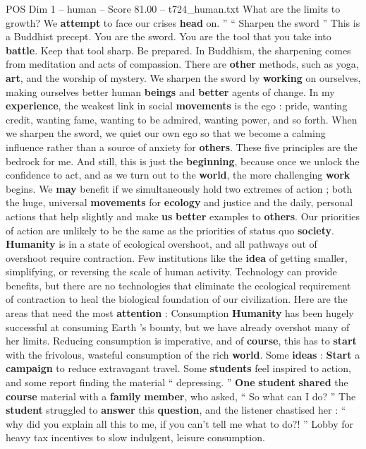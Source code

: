 \begin{textsample}{POS Dim 1 – human – Score 81.00 – t724\_human.txt}
What are the limits to growth?
We \textbf{attempt} to face our crises \textbf{head} on. ” “ Sharpen the sword ” This is a Buddhist precept.
You are the sword.
You are the tool that you take into \textbf{battle}.
Keep that tool sharp.
Be prepared.
In Buddhism, the sharpening comes from meditation and acts of compassion.
There are \textbf{other} methods, such as yoga, \textbf{art}, and the worship of mystery.
We sharpen the sword by \textbf{working} on ourselves, making ourselves better human \textbf{beings} and \textbf{better} agents of change.
In my \textbf{experience}, the weakest link in social \textbf{movements} is the ego : pride, wanting credit, wanting fame, wanting to be admired, wanting power, and so forth.
When we sharpen the sword, we quiet our own ego so that we become a calming influence rather than a source of anxiety for \textbf{others}.
These five principles are the bedrock for me.
And still, this is just the \textbf{beginning}, because once we unlock the confidence to act, and as we turn out to the \textbf{world}, the more challenging \textbf{work} begins.
We \textbf{may} benefit if we simultaneously hold two extremes of action ; both the huge, universal \textbf{movements} for \textbf{ecology} and justice and the daily, personal actions that help slightly and make \textbf{us} \textbf{better} examples to \textbf{others}.
Our priorities of action are unlikely to be the same as the priorities of status quo \textbf{society}. \textbf{Humanity} is in a state of ecological overshoot, and all pathways out of overshoot require contraction.
Few institutions like the \textbf{idea} of getting smaller, simplifying, or reversing the scale of human activity.
Technology can provide benefits, but there are no technologies that eliminate the ecological requirement of contraction to heal the biological foundation of our civilization.
Here are the areas that need the most \textbf{attention} : Consumption \textbf{Humanity} has been hugely successful at consuming Earth ’s bounty, but we have already overshot many of her limits.
Reducing consumption is imperative, and of \textbf{course}, this has to \textbf{start} with the frivolous, wasteful consumption of the rich \textbf{world}.
Some \textbf{ideas} : \textbf{Start} a \textbf{campaign} to reduce extravagant travel.
Some \textbf{students} feel inspired to action, and some report finding the material “ depressing. ” \textbf{One} \textbf{student} \textbf{shared} the \textbf{course} material with a \textbf{family} \textbf{member}, who asked, “ So what can I do? ” The \textbf{student} struggled to \textbf{answer} this \textbf{question}, and the listener chastised her : “ why did you explain all this to me, if you can't tell me what to do?! ” Lobby for heavy tax incentives to slow indulgent, leisure consumption.

\end{textsample}
